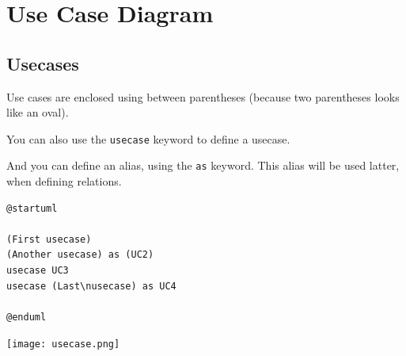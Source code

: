 %
%
% 
%
%
%
%
%
% 

\section{Use Case Diagram}

\subsection{Usecases}

\begin{description}
\item Use cases are enclosed using between parentheses (because two parentheses
looks like an oval).
\item You can also use the \texttt{usecase} keyword to define a usecase.
\item And you can define an alias, using the \texttt{as} keyword. This alias
will be used latter, when defining relations.
\end{description}

\begin{lstlisting}
@startuml

(First usecase)
(Another usecase) as (UC2)  
usecase UC3
usecase (Last\nusecase) as UC4

@enduml
\end{lstlisting}
\begin{center}
\texttt{[image: usecase.png]}
\end{center}

